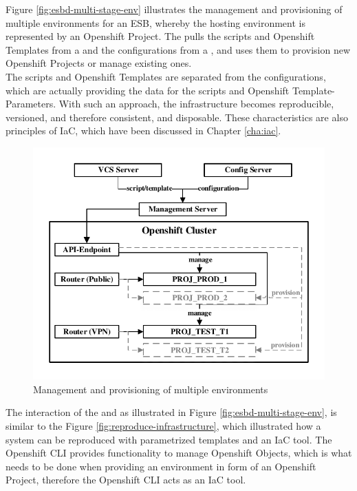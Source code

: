 Figure \vref{fig:esbd-multi-stage-env} illustrates the management and provisioning of multiple environments for an ESB, whereby the hosting environment is represented by an Openshift Project. The  pulls the scripts and Openshift Templates from a  and the configurations from a , and uses them to provision new Openshift Projects or manage existing ones. \\

The scripts and Openshift Templates are separated from the configurations, which are actually providing the data for the scripts and Openshift Template-Parameters. With such an approach, the infrastructure becomes reproducible, versioned, and therefore consistent, and disposable. These characteristics are also principles of IaC, which have been discussed in Chapter \vref{cha:iac}. 

\begin{figure}[htbp]
	\centering
	\includegraphics[scale=1]{images/esbd-multi-stage-env.pdf}
	\caption{Management and provisioning of multiple environments}
	\label{fig:esbd-multi-stage-env}
\end{figure}

The interaction of the  and  as illustrated in Figure \vref{fig:esbd-multi-stage-env}, is similar to the Figure \vref{fig:reproduce-infrastructure}, which illustrated how a system can be reproduced with parametrized templates and an IaC tool. The Openshift CLI provides functionality to manage Openshift Objects, which is what needs to be done when providing an environment in form of an Openshift Project, therefore the Openshift CLI acts as an IaC tool.  \\

